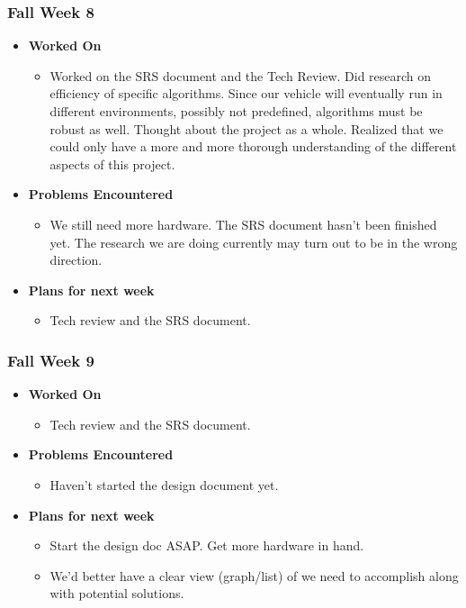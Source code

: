 \documentclass[compsoc,draftclsnofoot,onecolumn,10pt]{IEEEtran}
\begin{document}
\subsubsection{Fall Week 8}
\begin{itemize}
    \item {\textbf{Worked On}}
    \begin{itemize}
      \item Worked on the SRS document and the Tech Review. Did research on
      efficiency of specific algorithms. Since our vehicle will eventually
      run in different environments, possibly not predefined, algorithms
      must be robust as well. Thought about the project as a whole. Realized
      that we could only have a more and more thorough understanding of the
      different aspects of this project.
    \end{itemize}

    \item {\textbf{Problems Encountered}}
    \begin{itemize}
      \item We still need more hardware. The SRS document hasn't been
      finished yet. The research we are doing currently may turn out to be
      in the wrong direction.
    \end{itemize}

    \item{\textbf{Plans for next week}}
    \begin{itemize}
      \item Tech review and the SRS document.
    \end{itemize}

\end{itemize}

\subsubsection{Fall Week 9}
\begin{itemize}
    \item {\textbf{Worked On}}
    \begin{itemize}
      \item Tech review and the SRS document.
    \end{itemize}

    \item {\textbf{Problems Encountered}}
    \begin{itemize}
      \item Haven't started the design document yet.
    \end{itemize}

    \item{\textbf{Plans for next week}}
    \begin{itemize}
      \item Start the design doc ASAP. Get more hardware in hand.
      \item We'd better have a clear view (graph/list) of we need
      to accomplish along with potential solutions.
    \end{itemize}

\end{itemize}
\end{document}
